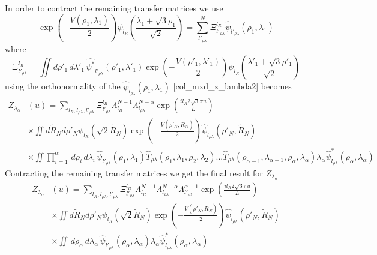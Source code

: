 %
In order to contract the remaining transfer matrices we use
%
\begin{equation}
\exp\left(-\frac{V\left(\rho_{1},\lambda_{1}\right)}{2}\right)\psi_{l_R}\left(\frac{\lambda_1 + \sqrt{3}\rho_1}{\sqrt{2}}\right) = \sum_{l'_{\rho\lambda}}^{N}\Xi_{l'_{\rho\lambda}}^{l_R}\hat{\psi}_{l'_{\rho\lambda}}\left(\rho_1,\lambda_1\right)
\end{equation}
%
where
%
\begin{equation}
\Xi_{l'_{\rho\lambda}}^{l_{R}} =\iint d\rho'_1\,d\lambda'_1\, \hat{\psi^{*}}_{l'_{\rho\lambda}}\left(\rho'_1,\lambda'_1\right)\exp\left(-\frac{V\left(\rho'_{1},\lambda'_{1}\right)}{2}\right)\psi_{l_R}\left(\frac{\lambda'_1 + \sqrt{3}\rho'_1}{\sqrt{2}}\right)
\end{equation}
%
using the orthonormality of the $\hat{\psi}_{l_{\rho\lambda}}\left(\rho_1,\lambda_1\right)$ \eqref{col_mxd_z_lambda2} becomes 
%
\begin{align}\label{col_mxd_z_lambda3}
Z_{\lambda_{\alpha}}& \left(u\right)= \sum_{l_R,l_{\rho\lambda},l'_{\rho\lambda}}\Xi_{l'_{\rho\lambda}}^{l_{R}}\Lambda_{l_{R}}^{N-1}\Lambda_{l_{\rho\lambda}}^{N-\alpha}\exp\left(\frac{il_{R}2\sqrt{3}\pi u}{L}\right)\nonumber\\
&\times\iint d\tilde{R}_N d\rho'_N\psi_{l_R}\left(\sqrt{2}\tilde{R}_N\right)\exp\left(-\frac{V\left(\rho'_{N},\tilde{R}_N\right)}{2}\right)\hat{\psi}_{l_{\rho\lambda}}\left(\rho'_{N},\tilde{R}_N\right)\nonumber\\
&\times\iint\prod^{\alpha}_{i=1}\,d\rho_i\,d\lambda_i\,\hat{\psi}_{l'_{\rho\lambda}}\left(\rho_1,\lambda_1\right)\hat{T}_{\rho\lambda}(\rho_1,\lambda_1,\rho_2,\lambda_2)...\hat{T}_{\rho\lambda}(\rho_{\alpha-1},\lambda_{\alpha-1},\rho_\alpha,\lambda_\alpha)\lambda_{\alpha}\hat{\psi}^{*}_{l_{\rho\lambda}}\left(\rho_{\alpha},\lambda_{\alpha}\right)
\end{align}
%
Contracting the remaining transfer matrices we get the final result for $Z_{\lambda_{\alpha}}$
%
\begin{align}\label{col_hyp_mxd_z_lambda_final}
Z_{\lambda_{\alpha}}& \left(u\right)=\sum_{l_R,l_{\rho\lambda},l'_{\rho\lambda}}\Xi_{l'_{\rho\lambda}}^{l_{R}}\Lambda_{l_{R}}^{N-1}\Lambda_{l_{\rho\lambda}}^{N-\alpha}\Lambda_{l'_{\rho\lambda}}^{\alpha-1}\exp\left(\frac{il_{R}2\sqrt{3}\pi u}{L}\right)\nonumber\\
&\times\iint d\tilde{R}_N d\rho'_N\psi_{l_R}\left(\sqrt{2}\tilde{R}_N\right)\exp\left(-\frac{V\left(\rho'_{N},\tilde{R}_N\right)}{2}\right)\hat{\psi}_{l_{\rho\lambda}}\left(\rho'_{N},\tilde{R}_N\right)\nonumber\\
&\times\iint\,d\rho_{\alpha}\,d\lambda_{\alpha}\,\hat{\psi}_{l'_{\rho\lambda}}\left(\rho_{\alpha},\lambda_{\alpha}\right)\lambda_{\alpha}\hat{\psi}^{*}_{l_{\rho\lambda}}\left(\rho_{\alpha},\lambda_{\alpha}\right)
\end{align}

